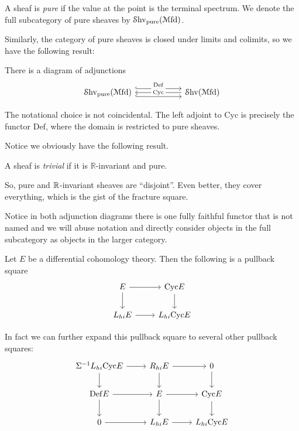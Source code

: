 \documentclass[10pt]{amsart}
\begin{document}
\begin{definition}
  A sheaf is \emph{pure} if the value at the point is the terminal spectrum. We denote the full subcategory of pure sheaves by $\mathcal{S}\mathrm{hv}_{\mathrm{pure}}(\mathcal{M}\mathrm{fd})$.
\end{definition}

Similarly, the category of pure sheaves is closed under limits and colimits, so we have the following result:

\begin{theorem}
 There is a diagram of adjunctions
 \[
 \begin{tikzcd}[column sep=2cm]
 \Shv_{\mathrm{pure}}(\Mfd) \arrow[r, shift left = 2, "\mathrm{Def}", hookrightarrow] \arrow[r, leftarrow, "\mathrm{Cyc}" description] \arrow[r, shift right = 2, hookrightarrow] & \Shv(\Mfd)
 \end{tikzcd}
 \]
\end{theorem}

\begin{remark}
  The notational choice is not coincidental. The left adjoint to $\mathrm{Cyc}$ is precisely the functor $\mathrm{Def}$, where the domain is restricted to pure sheaves.
\end{remark}

Notice we obviously have the following result.

\begin{lemma}
  A sheaf is \emph{trivial} if it is $\mathbb{R}$-invariant and pure.
\end{lemma}

So, pure and $\mathbb{R}$-invariant sheaves are ``disjoint''. Even better, they cover everything, which is the gist of the fracture square.

\begin{remark}
Notice in both adjunction diagrams there is one fully faithful functor that is not named and we will abuse notation and directly consider objects in the full subcategory as objects in the larger category.
\end{remark}
\begin{theorem}
 Let $E$ be a differential cohomology theory. Then the following is a pullback square
 \[
  \begin{tikzcd}
    E \arrow[r] \arrow[d] & \mathrm{Cyc} E \arrow[d] \\ 
    L_{hi}E \arrow[r] & L_{hi}\mathrm{Cyc} E
  \end{tikzcd}
 \]
\end{theorem}

In fact we can further expand this pullback square to several other pullback squares:
 \[
  \begin{tikzcd}
    \Sigma^{-1}L_{hi}\mathrm{Cyc} E \arrow[d] \arrow[r] & R_{hi}E \arrow[r] \arrow[d] & 0 \arrow[d] \\ 
    \mathrm{Def} E \arrow[r] \arrow[d] & E \arrow[r] \arrow[d] & \mathrm{Cyc} E \arrow[d] \\ 
    0 \arrow[r] & L_{hi}E \arrow[r] & L_{hi}\mathrm{Cyc} E
  \end{tikzcd}
 \]
\end{document}

